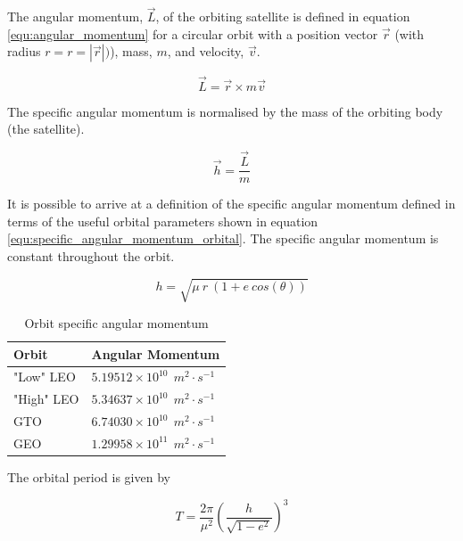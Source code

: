 \documentclass[a4paper, article, oneside, UKenglish]{memoir}
\newcommand{\0}{\mathbf{0}}
\newcommand{\1}{\mathbf{1}}
\begin{document}
The angular momentum, $ \vec {L} $, of the orbiting satellite is defined in equation \ref{equ:angular_momentum} for a circular orbit with a position vector $ \vec{r} $ (with radius $r = r=\left\vert \vec{r} \right\vert)$), mass, $m$, and velocity, $\vec{v}$.

\begin{equation}
\vec{L} = \vec{r} \times m \vec{v}
\label{equ:angular_momentum}
\end{equation}

The specific angular momentum is normalised by the mass of the orbiting body (the satellite).

\begin{equation}
\vec{h} = \frac{\vec{L}}{m}
\label{equ:specific_angular_momentum}
\end{equation}

It is possible to arrive at a definition of the specific angular momentum defined in terms of the useful orbital parameters shown in equation \ref{equ:specific_angular_momentum_orbital}.  The specific angular momentum is constant throughout the orbit.

\begin{equation}
h = \sqrt{ \mu ~ r ~ (1 + e ~ cos( \theta )) }
\label{equ:specific_angular_momentum_orbital}
\end{equation}

\begin{table}[h]
\centering
\begin{tabular}{@{}ll@{}}
\toprule
Orbit 		& Angular Momentum			\\ \midrule
"Low" LEO   & $ 5.19512 \times 10^{10} ~~ m^2 \cdot s^{-1}$	\\
"High" LEO	& $ 5.34637 \times 10^{10} ~~ m^2 \cdot s^{-1}$	\\
GTO      	& $ 6.74030 \times 10^{10} ~~ m^2 \cdot s^{-1}$	\\
GEO      	& $ 1.29958 \times 10^{11} ~~ m^2 \cdot s^{-1}$	\\ \bottomrule
\end{tabular}
\captionsetup{justification=centering}
\caption{Orbit specific angular momentum}
\label{tab:orbital_momentum}
\end{table}



The orbital period is given by 

\begin{equation}
T = \frac{2 \pi}{\mu^2} {\left( \frac{h}{ \sqrt{1 - e^2} } \right)}^3
\label{equ:orbital_period}
\end{equation}
\end{document}
